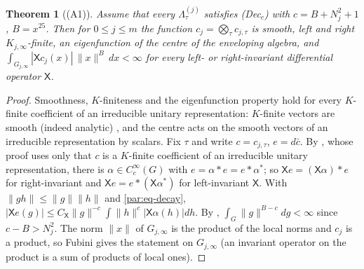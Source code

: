 \documentclass[10pt]{amsart}
\newtheorem{theorem}{Theorem}[section]
\theoremstyle{definition}
\theoremstyle{remark}
\begin{document}
\begin{theorem}[(A1)]\label{par:A1}
Assume that every $\Lambda^{(j)}_\tau$ satisfies \textup{(Dec$_c$)} with $c=B+N_j^2+1$, $B=x^{25}$.
Then for $0\le j\le m$ the function $c_j=\bigotimes_\tau c_{j,\tau}$ is smooth, left and right
$K_{j,\infty}$-finite, an eigenfunction of the centre of the enveloping algebra, and
$\int_{G_{j,\infty}}|\mathsf Xc_j(x)|\,\|x\|^B\,dx<\infty$ for every left- or right-invariant
differential operator $\mathsf X$.
\end{theorem}
\begin{proof}
Smoothness, $K$-finiteness and the eigenfunction property hold for every $K$-finite coefficient
of an irreducible unitary representation: $K$-finite vectors are smooth (indeed analytic)
\cite[Proposition~8.5, p.~208]{Knapp}, and the centre acts on the smooth vectors of an irreducible representation
by scalars. Fix $\tau$ and write $c=c_{j,\tau}$, $e=d\bar c$. By {\cite[Lemma~4.7(b)]{P51}}, whose proof
uses only that $c$ is a $K$-finite coefficient of an irreducible unitary representation, there
is $\alpha\in C_c^\infty(G)$ with $e=\alpha*e=e*\alpha^*$; so $\mathsf Xe=(\mathsf X\alpha)*e$ for
right-invariant and $\mathsf Xe=e*(\mathsf X\alpha^*)$ for left-invariant $\mathsf X$. With
$\|gh\|\le\|g\|\|h\|$ and \eqref{par:eq-decay},
$|\mathsf Xe(g)|\le C_{\mathsf X}\|g\|^{-c}\int\|h\|^c|\mathsf X\alpha(h)|dh$. By
{\cite[Lemma~4.7(c)]{P51}}, $\int_G\|g\|^{B-c}dg<\infty$ since $c-B>N_j^2$. The norm $\|x\|$ of
$G_{j,\infty}$ is the product of the local norms and $c_j$ is a product, so Fubini gives the
statement on $G_{j,\infty}$ (an invariant operator on the product is a sum of products of local
ones).
\end{proof}
\end{document}

